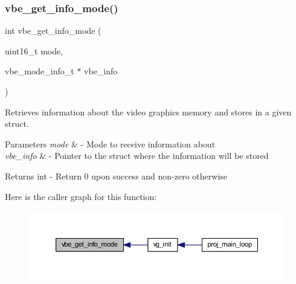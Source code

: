 \subsubsection{\texorpdfstring{vbe\+\_\+get\+\_\+info\+\_\+mode()}{vbe\_get\_info\_mode()}}
{\footnotesize\ttfamily int vbe\+\_\+get\+\_\+info\+\_\+mode (\begin{DoxyParamCaption}\item[{uint16\+\_\+t}]{mode,  }\item[{vbe\+\_\+mode\+\_\+info\+\_\+t $\ast$}]{vbe\+\_\+info }\end{DoxyParamCaption})}



Retrieves information about the video graphics memory and stores in a given struct. 


\begin{DoxyParams}{Parameters}
{\em mode} & -\/ Mode to receive information about \\
\hline
{\em vbe\+\_\+info} & -\/ Pointer to the struct where the information will be stored \\
\hline
\end{DoxyParams}
\begin{DoxyReturn}{Returns}
int -\/ Return 0 upon success and non-\/zero otherwise 
\end{DoxyReturn}
Here is the caller graph for this function\+:
\nopagebreak
\begin{figure}[H]
\begin{center}
\leavevmode
\includegraphics[width=350pt]{group__vbe_ga384e6657ec15cb7f19a2d15b0337b72a_icgraph}
\end{center}
\end{figure}

